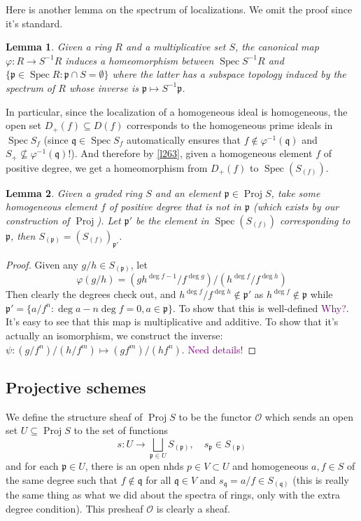 \documentclass[12pt]{article}
\newtheorem{lemma}{Lemma}[subsection]
\theoremstyle{remark}
\newcommand{\Spec}[0]{\operatorname{Spec}}
\newcommand{\Proj}[0]{\operatorname{Proj}}
\begin{document}
	Here is another lemma on the spectrum of localizations. We omit the proof since it's standard.
	\begin{lemma}\label{l264}
		Given a ring $R$ and a multiplicative set $S$, the canonical map $\varphi:R\to S^{-1}R$ induces a homeomorphism between $\Spec S^{-1}R$ and $\{\mathfrak p\in \Spec R:\mathfrak p\cap S=\emptyset\}$ where the latter has a subspace topology induced by the spectrum of $R$ whose inverse is $\mathfrak p\mapsto S^{-1}\mathfrak p$.
	\end{lemma}
	In particular, since the localization of a homogeneous ideal is homogeneous, the open set $D_+(f)\subseteq D(f)$ corresponds to the homogeneous prime ideals in $\Spec S_f$ (since $\mathfrak q\in\Spec S_f$ automatically ensures that $f\notin\varphi^{-1}(\mathfrak q)$ and $S_+\not\subseteq \varphi^{-1}(\mathfrak q)$!). And therefore by \autoref{l263}, given a homogeneous element $f$ of positive degree, we get a homeomorphism from $D_+(f)$ to $\Spec(S_{(f)})$.

	\begin{lemma}\label{264}
		Given a graded ring $S$ and an element $\mathfrak p\in\Proj S$, take some homogeneous element $f$ of positive degree that is not in $\mathfrak p$ (which exists by our construction of $\Proj$). Let $\mathfrak p'$ be the element in $\Spec(S_{(f)})$ corresponding to $\mathfrak p$, then $S_{(\mathfrak p)}=(S_{(f)})_{\mathfrak p'}$.
	\end{lemma}
	\begin{proof}
		Given any $g/h\in S_{(\mathfrak p)}$, let
		\[\varphi(g/h)=(gh^{\deg f-1}/f^{\deg g})/(h^{\deg f}/f^{\deg h})\]
		Then clearly the degrees check out, and $h^{\deg f}/f^{\deg h}\notin\mathfrak p'$ as $h^{\deg f}\notin\mathfrak p$ while $\mathfrak p'=\{a/f^n:\deg a-n\deg f=0, a\in\mathfrak p\}$. To show that this is well-defined \textcolor{purple}{Why?}. It's easy to see that this map is multiplicative and additive. To show that it's actually an isomorphism, we construct the inverse: $\psi:(g/f^{n})/(h/f^{m})\mapsto (gf^{m})/(hf^n)$. \textcolor{purple}{Need details!}
	\end{proof}

	\subsection{Projective schemes}\label{ssec-proj-scheme}
	We define the structure sheaf of $\Proj S$ to be the functor $\mathscr O$ which sends an open set $U\subseteq\Proj S$ to the set of functions
	\[s:U\to \bigsqcup_{\mathfrak p\in U}S_{(\mathfrak p)},\quad s_{\mathfrak p}\in S_{(\mathfrak p)}\]
	and for each $\mathfrak p\in U$, there is an open nhds $p\in V\subset U$ and homogeneous $a, f\in S$ of the same degree such that $f\notin \mathfrak q$ for all $\mathfrak q\in V$ and $s_{\mathfrak q}=a/f\in S_{(\mathfrak q)}$ (this is really the same thing as what we did about the spectra of rings, only with the extra degree condition). This presheaf $\mathscr O$ is clearly a sheaf.
	
\end{document}
